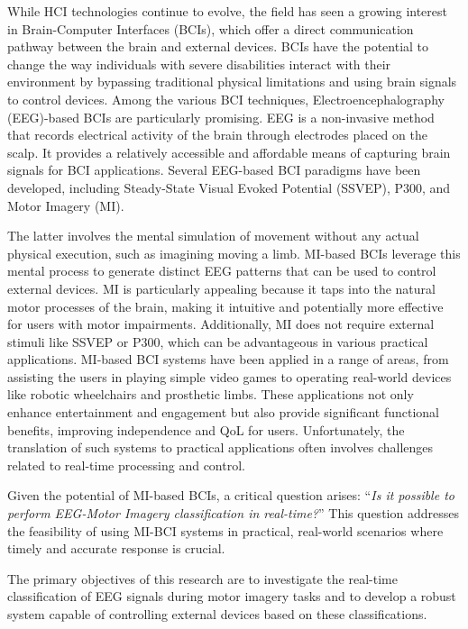 While HCI technologies continue to evolve, the field has seen a growing interest in Brain-Computer Interfaces (BCIs), which offer a direct communication pathway between the brain and external devices. 
BCIs have the potential to change the way individuals with severe disabilities interact with their environment by bypassing traditional physical limitations and using brain signals to control devices.
Among the various BCI techniques, Electroencephalography (EEG)-based BCIs are particularly promising. 
EEG is a non-invasive method that records electrical activity of the brain through electrodes placed on the scalp. 
It provides a relatively accessible and affordable means of capturing brain signals for BCI applications. 
Several EEG-based BCI paradigms have been developed, including Steady-State Visual Evoked Potential (SSVEP), P300, and Motor Imagery (MI).

The latter involves the mental simulation of movement without any actual physical execution, such as imagining moving a limb. 
MI-based BCIs leverage this mental process to generate distinct EEG patterns that can be used to control external devices. 
MI is particularly appealing because it taps into the natural motor processes of the brain, making it intuitive and potentially more effective for users with motor impairments. 
Additionally, MI does not require external stimuli like SSVEP or P300, which can be advantageous in various practical applications.
MI-based BCI systems have been applied in a range of areas, from assisting the users in playing simple video games to operating real-world devices like robotic wheelchairs and prosthetic limbs.
These applications not only enhance entertainment and engagement but also provide significant functional benefits, improving independence and QoL for users.
Unfortunately, the translation of such systems to practical applications often involves challenges related to real-time processing and control.

Given the potential of MI-based BCIs, a critical question arises: ``\emph{Is it possible to perform EEG-Motor Imagery classification in real-time?}'' 
This question addresses the feasibility of using MI-BCI systems in practical, real-world scenarios where timely and accurate response is crucial.

The primary objectives of this research are to investigate the real-time classification of EEG signals during motor imagery tasks and to develop a robust system capable of controlling external devices based on these classifications. 

